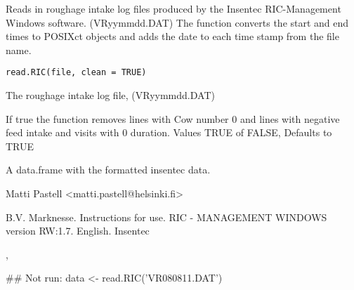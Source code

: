 \begin{Description}\relax
Reads in roughage intake log files produced by the Insentec
RIC-Management Windows software. (VRyymmdd.DAT) The function converts
the start and end times to POSIXct  objects and adds the date to each
time stamp from the file name.
\end{Description}
\begin{Usage}
\begin{verbatim}
read.RIC(file, clean = TRUE)
\end{verbatim}
\end{Usage}
\begin{Arguments}
\begin{ldescription}
\item[\code{file}] The roughage intake log file, (VRyymmdd.DAT)
\item[\code{clean}] If true the function removes lines with Cow number 0 and
lines with negative feed intake and visits with 0 duration.
Values TRUE of FALSE, Defaults to TRUE
\end{ldescription}
\end{Arguments}
\begin{Value}
A data.frame with the formatted insentec data.
\end{Value}
\begin{Author}\relax
Matti Pastell <matti.pastell@helsinki.fi>
\end{Author}
\begin{References}\relax
B.V. Marknesse. Instructions for use. RIC - MANAGEMENT WINDOWS version
RW:1.7. English. Insentec
\end{References}
\begin{SeeAlso}\relax
{}, 
\end{SeeAlso}
\begin{Examples}
\begin{ExampleCode}
## Not run: data <- read.RIC('VR080811.DAT')
\end{ExampleCode}
\end{Examples}

